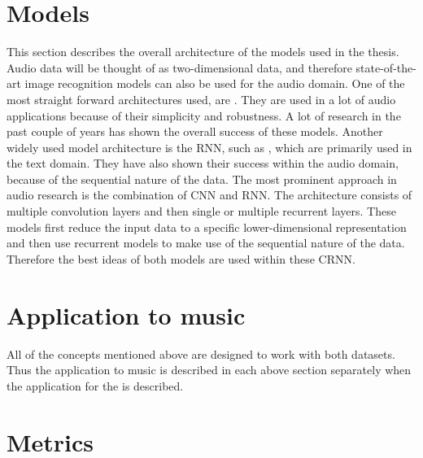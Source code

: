 \section{Models}
\label{sec:Models}
This section describes the overall architecture of the models used in the thesis. Audio data will be thought of as two-dimensional data, and therefore state-of-the-art image recognition models can also be used for the audio domain.
\newline
\newline
One of the most straight forward architectures used, are . They are used in a lot of audio applications because of their simplicity and robustness. A lot of research in the past couple of years has shown the overall success of these models.
\newline
\newline
Another widely used model architecture is the \gls{RNN}, such as , which are primarily used in the text domain. They have also shown their success within the audio domain, because of the sequential nature of the data.
\newline
\newline
The most prominent approach in audio research is the combination of \gls{CNN} and \gls{RNN}. The architecture consists of multiple convolution layers and then single or multiple recurrent layers. These models first reduce the input data to a specific lower-dimensional representation and then use recurrent models to make use of the sequential nature of the data. Therefore the best ideas of both models are used within these \gls{CRNN}.

\section{Application to music}
\label{sec:Application-Music}
All of the concepts mentioned above are designed to work with both datasets. Thus the application to music is described in each above section separately when the application for the  is described.

\section{Metrics}
\label{sec:Metrics}
